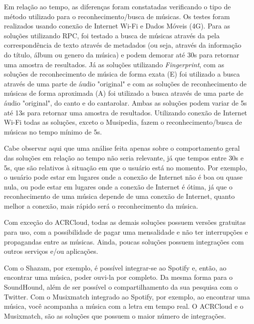 Em relação ao tempo, as diferenças foram constatadas verificando o tipo de método utilizado para o reconhecimento/busca de músicas. Os testes foram realizados usando conexão de Internet Wi-Fi e Dados Móveis (4G). Para as soluções utilizando RPC, foi testado a busca de músicas através da pela correspondência de texto através de metadados (ou seja, através da informação do título, álbum ou genero da música) e podem demorar até 30s para retornar uma amostra de resultados. Já as soluções utilizando \textit{Fingerprint}, com as soluções de reconhecimento de música de forma exata (E) foi utilizado a busca através de uma parte de áudio "original" e com as soluções de reconhecimento de músicas de forma aproximada (A) foi utilizado a busca através de uma parte de áudio "original", do canto e do cantarolar. Ambas as soluções podem variar de 5s até 13s para retornar uma amostra de resultados. Utilizando conexão de Internet Wi-Fi todas as soluções, exceto o Musipedia, fazem o reconhecimento/busca de músicas no tempo mínimo de 5s.

Cabe observar aqui que uma análise feita apenas sobre o comportamento geral das soluções em relação ao tempo não seria relevante, já que tempos entre 30s e 5s, que são relativos à situação em que o usuário está no momento. Por exemplo, o usuário pode estar em lugares onde a conexão de Internet não é boa ou quase nula, ou pode estar em lugares onde a conexão de Internet é ótima, já que o reconhecimento de uma música depende de uma conexão de Internet, quanto melhor a conexão, mais rápido será o reconhecimento da música.


Com exceção do ACRCloud, todas as demais soluções possuem versões gratuitas para uso, com a possibilidade de pagar uma mensalidade e não ter interrupções e propagandas entre as músicas. Ainda, poucas soluções possuem integrações com outros serviços e/ou aplicações.


Com o Shazam, por exemplo, é possível integrar-se ao Spotify e, então, ao encontrar uma música, poder ouvi-la por completo. Da mesma forma para o SoundHound, além de ser possível o compartilhamento da sua pesquisa com o Twitter. Com o Musixmatch integrado ao Spotify, por exemplo, ao encontrar uma música, você acompanha a música com a letra em tempo real. O ACRCloud e o Musixmatch, são as soluções que possuem o maior número de integrações.

